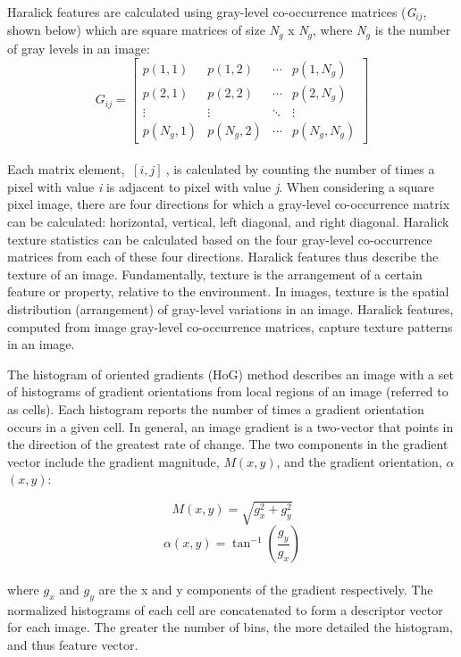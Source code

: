Haralick features \cite{Haralick1973} are calculated using gray-level co-occurrence matrices (\textit{G$_{ij}$}, shown below) which are square matrices of size \textit{N$_g$} x \textit{N$_g$}, where \textit{N$_g$} is the number of gray levels in an image:
\\
\begin{equation}
G_{ij}=
  \begin{bmatrix}
    p(1,1) & p(1,2) & \cdots       & p(1,N_{g}) \\
    p(2,1) & p(2,2) &  \cdots      & p(2,N_{g}) \\
     \vdots &  \vdots &  \ddots    &  \vdots          \\
    p(N_{g},1)  & p(N_{g},2) & \cdots & p(N_{g},N_{g}) 
  \end{bmatrix}
\end{equation}
\\
Each matrix element, $ \ [i,j]\ $, is calculated by counting the number of times a pixel with value \textit{i} is adjacent to pixel with value \textit{j}.  When considering a square pixel image, there are four directions for which a gray-level co-occurrence matrix can be calculated: horizontal, vertical, left diagonal, and right diagonal.  Haralick texture statistics can be calculated based on the four gray-level co-occurrence matrices from each of these four directions. Haralick features thus describe the texture of an image. Fundamentally, texture is the arrangement of a certain feature or property, relative to the environment. In images, texture is the spatial distribution (arrangement) of gray-level variations in an image. Haralick features, computed from image gray-level co-occurrence matrices, capture texture patterns in an image. 

The histogram of oriented gradients (HoG) \cite{Dalal2005} method describes an image with a set of histograms of gradient orientations from local regions of an image (referred to as cells).  Each histogram reports the number of times a gradient orientation occurs in a given cell.  In general, an image gradient is a two-vector that points in the direction of the greatest rate of change.  The two components in the gradient vector include the gradient magnitude, $M(x,y)$, and the gradient orientation, $\alpha$$(x,y)$: 

\begin{equation}
M(x,y) = \sqrt{g_{x}^2+g_{y}^2}
\end{equation}
\begin{equation}
\alpha(x,y) = \tan^{-1}({\frac{g_{y}}{g_{x}}})
\end{equation}
\\
where $g_{x}$ and $g_{y}$ are the x and y components of the gradient respectively.  The normalized histograms of each cell are concatenated to form a descriptor vector for each image.  The greater the number of bins, the more detailed the histogram, and thus feature vector.

